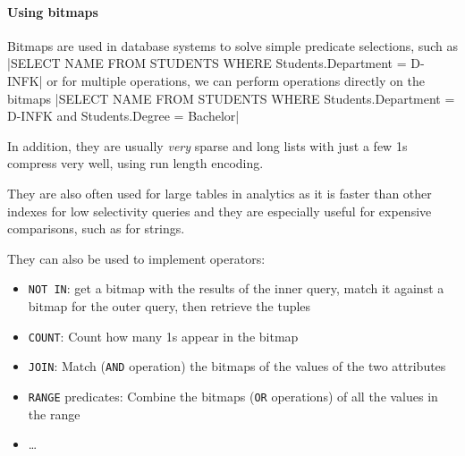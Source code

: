 \paragraph{Using bitmaps}
Bitmaps are used in database systems to solve simple predicate selections, such as
|SELECT NAME FROM STUDENTS WHERE Students.Department = D-INFK|
or for multiple operations, we can perform operations directly on the bitmaps
|SELECT NAME FROM STUDENTS WHERE Students.Department = D-INFK and Students.Degree = Bachelor|

In addition, they are usually \textit{very} sparse and long lists with just a few 1s compress very well, using run length encoding.

They are also often used for large tables in analytics as it is faster than other indexes for low selectivity queries
and they are especially useful for expensive comparisons, such as for strings.

They can also be used to implement operators:
\begin{itemize}
    \item \texttt{NOT IN}: get a bitmap with the results of the inner query, match it against a bitmap for the outer query,
          then retrieve the tuples
    \item \texttt{COUNT}: Count how many 1s appear in the bitmap
    \item \texttt{JOIN}: Match (\texttt{AND} operation) the bitmaps of the values of the two attributes
    \item \texttt{RANGE} predicates: Combine the bitmaps (\texttt{OR} operations) of all the values in the range
    \item \dots
\end{itemize}
